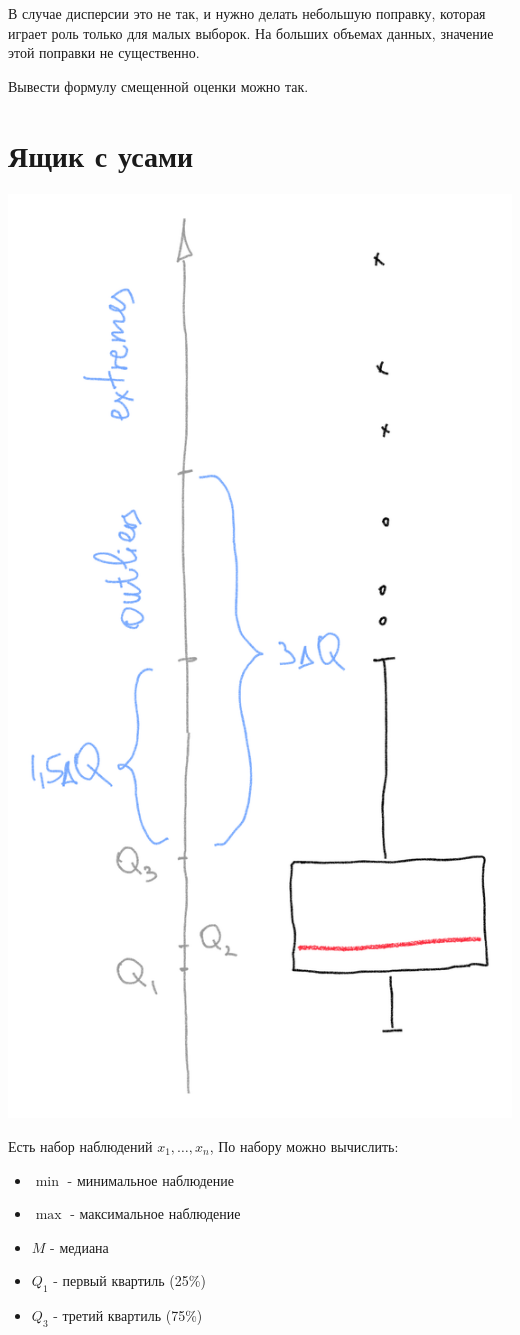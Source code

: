 \documentclass[a4paper, oneside]{book}
\begin{document}
В случае дисперсии это не так, и нужно делать небольшую поправку, которая играет роль только для малых выборок. На больших объемах данных, значение этой поправки не существенно.

Вывести формулу смещенной оценки можно так.

\section{Ящик с усами}

\begin{marginfigure}
    \includegraphics[width=0.7\columnwidth]{pics/boxplot.pdf}
    \label{fig:boxplot}
\end{marginfigure}

Есть набор наблюдений $x_1, \dots, x_n$, По набору можно вычислить:
\begin{itemize}
    \item $\min$ - минимальное наблюдение
    \item $\max$ - максимальное наблюдение
    \item $M$ - медиана
    \item $Q_1$ - первый квартиль (25\%)
    \item $Q_3$ - третий квартиль (75\%)
\end{itemize}
\end{document}

